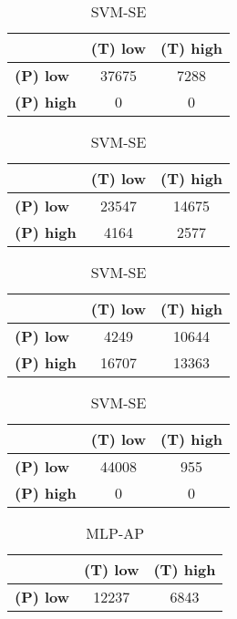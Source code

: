 \begin{landscape}
\begin{table}[htbp]
\begin{minipage}{.3\textwidth}
\tiny
\caption*{SVM-AP}
\begin{tabular}{|l|c|c|}
\hline
					& \textbf{(T) low}	& \textbf{(T) high}	\\ \hline
\textbf{(P) low}	& 37675				& 7288				\\ \hline
\textbf{(P) high}	& 0					& 0					\\ \hline
\end{tabular}
\end{minipage}\hfill
\begin{minipage}{.3\textwidth}
\tiny
\caption*{SVM-AT}
\begin{tabular}{|l|c|c|}
\hline
					& \textbf{(T) low}	& \textbf{(T) high}	\\ \hline
\textbf{(P) low}	& 23547				& 14675				\\ \hline
\textbf{(P) high}	& 4164				& 2577				\\ \hline
\end{tabular}
\end{minipage}\hfill
\begin{minipage}{.3\textwidth}
\tiny
\caption*{SVM-PL}
\begin{tabular}{|l|c|c|}
\hline
					& \textbf{(T) low}	& \textbf{(T) high}	\\ \hline
\textbf{(P) low}	& 4249				& 10644				\\ \hline
\textbf{(P) high}	& 16707				& 13363				\\ \hline
\end{tabular}
\end{minipage}\hfill
\begin{minipage}{.3\textwidth}
\tiny
\caption*{SVM-SE}
\begin{tabular}{|l|c|c|}
\hline
					& \textbf{(T) low}	& \textbf{(T) high}	\\ \hline
\textbf{(P) low}	& 44008				& 955				\\ \hline
\textbf{(P) high}	& 0					& 0					\\ \hline
\end{tabular}
\end{minipage}\hfill
\end{table}
\begin{table}[htbp]
\centering
\begin{minipage}{.3\textwidth}
\tiny
\caption*{MLP-AP}
\begin{tabular}{|l|c|c|}
\hline
					& \textbf{(T) low}	& \textbf{(T) high}	\\ \hline
\textbf{(P) low}	& 12237				& 6843				\\ \hline

\end{tabular}
\end{minipage}
\end{table}
\end{landscape}
